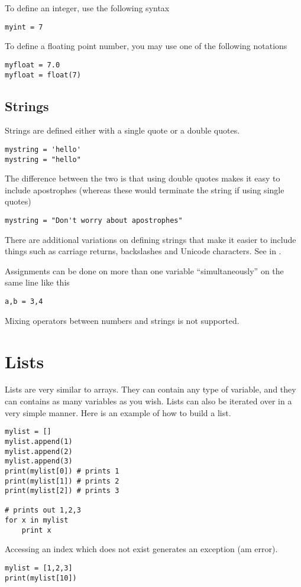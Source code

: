 \documentclass[a4paper,oneside]{book}
\numberwithin{equation}{chapter}
\begin{document}
To define an integer, use the following syntax
\begin{verbatim}
myint = 7
\end{verbatim}

To define a floating point number, you may use one of the following notations
\begin{verbatim}
myfloat = 7.0
myfloat = float(7)
\end{verbatim}
\subsection{Strings}
Strings are defined either with a single quote or a double quotes.
\begin{verbatim}
mystring = 'hello'
mystring = "hello"
\end{verbatim}

The difference between the two is that using double quotes makes it easy to include apostrophes (whereas these would terminate the string if using single quotes)
\begin{verbatim}
mystring = "Don't worry about apostrophes"
\end{verbatim}

There are additional variations on defining strings that make it easier to include things such as carriage returns, backslashes and Unicode characters. See in \cite{2}.

Assignments can be done on more than one variable ``simultaneously'' on the same line like this
\begin{verbatim}
a,b = 3,4
\end{verbatim}

Mixing operators between numbers and strings is not supported.
\section{Lists}
Lists are very similar to arrays. They can contain any type of variable, and they can contains as many variables as you wish. Lists can also be iterated over in a very simple manner. Here is an example of how to build a list.
\begin{verbatim}
mylist = []
mylist.append(1)
mylist.append(2)
mylist.append(3)
print(mylist[0]) # prints 1
print(mylist[1]) # prints 2
print(mylist[2]) # prints 3

# prints out 1,2,3
for x in mylist
    print x
\end{verbatim}

Accessing an index which does not exist generates an exception (am error).
\begin{verbatim}
mylist = [1,2,3]
print(mylist[10])
\end{verbatim}
\end{document}
